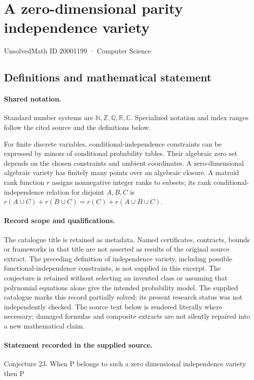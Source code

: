 \documentclass[11pt]{article}
\begin{document}
\setcounter{section}{20001198}
\section{A zero-dimensional parity independence variety}\label{20001199}
{\small\sffamily UnsolvedMath ID 20001199 · Computer Science}
\subsection{Definitions and mathematical statement}

\paragraph{Shared notation.}Standard number systems are $\mathbb N,\mathbb Z,\mathbb Q,\mathbb R,\mathbb C$. Specialized notation and index ranges follow the cited source and the definitions below.


For finite discrete variables, conditional-independence constraints can be expressed by minors of conditional probability tables. Their algebraic zero set depends on the chosen constraints and ambient coordinates. A zero-dimensional algebraic variety has finitely many points over an algebraic closure. A matroid rank function $r$ assigns nonnegative integer ranks to subsets; its rank conditional-independence relation for disjoint $A,B,C$ is $r(A\cup C)+r(B\cup C)=r(C)+r(A\cup B\cup C)$.
\paragraph{Record scope and qualifications.}
The catalogue title is retained as metadata. Named certificates, contracts, bounds or frameworks in that title are not asserted as results of the original source extract.
The preceding definition of independence variety, including possible functional-independence constraints, is not supplied in this excerpt. The conjecture is retained without selecting an invented class or assuming that polynomial equations alone give the intended probability model. The supplied catalogue marks this record partially solved; its present research status was not independently checked.
The source text below is rendered literally where necessary; damaged formulas and composite extracts are not silently repaired into a new mathematical claim.
\paragraph{Statement recorded in the supplied source.}
Conjecture 23. When P belongs to such a zero dimensional independence variety then P
\end{document}
